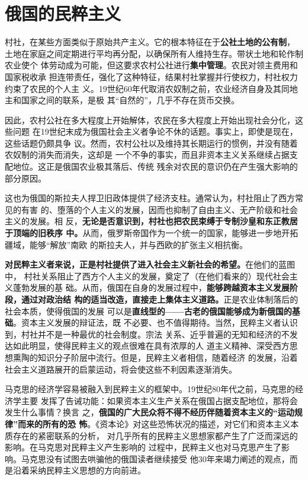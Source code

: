 \section{俄国的民粹主义}

村社，在某些方面类似于原始共产主义。它的根本特征在于\textbf{公社土地的公有制}，
土地在家庭之间定期进行平均再分配，以确保所有人维持生存。带状土地和轮作制农业使个
体劳动成为可能，但这要求农村公社进行\textbf{集中管理}。农民对领主费用和国家税收承
担连带责任，强化了这种特征，结果村社掌握并行使权力，村社权力约束了农民的个人主
义。19世纪60年代取消农奴制之前，农业经济自身及其同地主和国家之间的联系，是极
其“自然的”，几乎不存在货币交换。

因此，农村公社在多大程度上开始解体，农民在多大程度上开始出现社会分化，这些问题
在19世纪末成为俄国社会主义者争论不休的话题。事实上，即使是现在，这些话题仍颇具争
议。然而，农村公社以及维持其长期运行的惯例，并没有随着农奴制的消失而消失，这却是
一个不争的事实，而且非资本主义关系继续占据支配地位。这正是俄国农业极其落后、传统
残余对农民的意识仍在产生强大影响的部分原因。

这也为俄国的斯拉夫人捍卫旧政体提供了经济支柱。通常认为，村社阻止了西方常见的有害
的、堕落的个人主义的发展，因而也抑制了自由主义、无产阶级和社会主义的发展。相
反，\textbf{无论是否意识到，村社也把农民束缚于专制沙皇和东正教居于顶端的旧秩序
  中。}从而，俄罗斯帝国作为一个统一的国家，能够进一步地开拓疆域，能够“解放”南欧
的斯拉夫人，并与西欧的扩张主义相抗衡。

\textbf{对民粹主义者来说，正是村社提供了进入社会主义新社会的希望。}在他们的蓝图中，
村社关系阻止了西方个人主义的发展，奠定了（在他们看来的）现代社会主义蓬勃发展的基
础。从而，俄国在自身的发展过程中，\textbf{能够跨越资本主义发展阶段，通过对政治结
  构的适当改造，直接走上集体主义道路。}正是农业体制落后的社会本质，使得俄国的发展
可以是\textbf{直线型的——古老的俄国能够成为新俄国的基础}。资本主义发展的辩证法，既
不必要、也不值得期待。当然，民粹主义者认识到，村社并不是一种最优的社会制度。宗法
关系、近乎普遍的无知和经济的不发达如此明显，使得民粹主义的观点很难在具有浓厚的人
道主义精神、深受西方思想熏陶的知识分子阶层中流行。但是，民粹主义者相信，随着经济
的发展，沿着社会主义道路展开的启蒙运动，将会使这些不利因素逐渐消失。

马克思的经济学容易被融入到民粹主义的框架中。19世纪80年代之前，马克思的经济学主要
发挥了告诫功能：如果资本主义生产关系在俄国占据支配地位，那将会发生什么事情？换言
之，\textbf{俄国的广大民众将不得不经历伴随着资本主义的“运动规律”而来的所有的恐
  怖}。《资本论》对这些恐怖状况的描述，对它们和资本主义本质存在的紧密联系的分析，
对几乎所有的民粹主义思想家都产生了广泛而深远的影响。在马克思对民粹主义产生影响的
过程中，民粹主义也对马克思产生了影响。马克思没有试图去哄骗他的俄国读者继续接受
他30年来竭力阐述的观点，而是沿着采纳民粹主义思想的方向前进。

